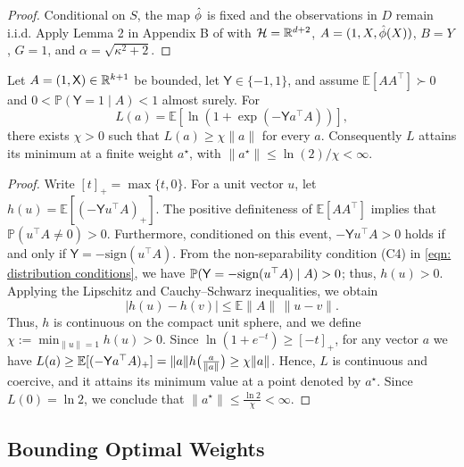\begin{proof}
    Conditional on $S$, the map $\hat{\phi}$ is fixed and the observations in $D$ remain i.i.d. Apply Lemma 2 in Appendix B of \cite{della2021regularized} with $\mathcal H=\mathbb{R}^{d+2}$, $A=(1,X,\hat{\phi}(X))$, $B=Y$, $G=1$, and $\alpha=\sqrt{\kappa^2+2}$. 
\end{proof}

 

\begin{lem}\label{lem: finite norm for optimal weights}
Let $A=(1,\mathsf X)\in\mathbb{R}^{k+1}$ be bounded, let $\mathsf Y\in\{-1,1\}$, and assume
$\mathbb E[AA^\top]\succ0$ and $0<\mathbb P(\mathsf Y=1\mid A)<1$ almost surely.
For
\[
L(a)=\mathbb E\!\left[\ln(1+\exp(-\mathsf Y a^\top A))\right],
\]
there exists $\chi>0$ such that $L(a)\geq\chi\|a\|$ for every $a$.
Consequently $L$ attains its minimum at a finite weight $a^\star$, with
$\|a^\star\|\leq\ln(2)/\chi < \infty$.
\end{lem}

\begin{proof}
Write $[t]_+=\max\{t,0\}$. For a unit vector $u$, let $h(u)=\mathbb E[(-\mathsf Y u^\top A)_+]$. The positive definiteness of $\mathbb E[AA^\top]$ implies that $\mathbb P(u^\top A\neq0)>0$. Furthermore, conditioned on this event, $-\mathsf Y u^\top A>0$ holds if and only if $\mathsf{Y} = -\text{sign}(u^\top A)$. From the non-separability condition (C4) in \eqref{eqn: distribution conditions}, we have $\mathbb{P}(\mathsf{Y} = -\text{sign}(u^\top A) \mid A) > 0$; thus, $h(u) > 0$. Applying the Lipschitz and Cauchy--Schwarz inequalities, we obtain 
\[
|h(u)-h(v)|\leq\mathbb E\|A\|\,\|u-v\|.
\]
Thus, $h$ is continuous on the compact unit sphere, and we define $\chi:=\min_{\|u\|=1}h(u)>0$. Since $\ln(1+e^{- t})\geq[-t]_+$, for any vector $a$ we have $L(a) \ge \mathbb{E}[(-\mathsf Y a^\top A)_+] = \|a\|h\big(\frac{a}{\|a\|}\big) \ge \chi\|a\|$. Hence, $L$ is continuous and coercive, and it attains its minimum value at a point denoted by $a^\star$. Since $L(0)=\ln2$, we conclude that $\|a^\star\|\le\frac{\ln2}{\chi} < \infty$.
\end{proof}


\subsection{Bounding Optimal Weights}\label{sec: Bounding optimal weights}

